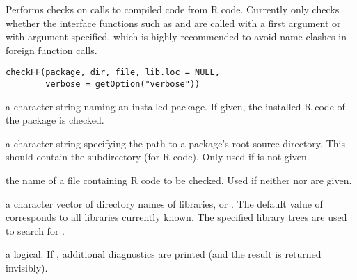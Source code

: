 %
\begin{Examples}
\end{Examples}
%
\begin{Description}\relax
Performs checks on calls to compiled code from R code.  Currently only
checks whether the interface functions such as  and
 are called with a 
first argument or with argument  specified, which is
highly recommended to avoid name clashes in foreign function calls.
\end{Description}
%
\begin{Usage}
\begin{verbatim}
checkFF(package, dir, file, lib.loc = NULL,
        verbose = getOption("verbose"))
\end{verbatim}
\end{Usage}
%
\begin{Arguments}
\begin{ldescription}
\item[\code{package}] a character string naming an installed package.  If
given, the installed R code of the package is checked.
\item[\code{dir}] a character string specifying the path to a package's root
source directory.  This should contain the subdirectory 
(for R code).  Only used if  is not given.
\item[\code{file}] the name of a file containing R code to be checked.  Used
if neither  nor  are given.
\item[\code{lib.loc}] a character vector of directory names of \R{} libraries,
or .  The default value of  corresponds to all
libraries currently known.  The specified library trees are used to
search for .
\item[\code{verbose}] a logical.  If , additional diagnostics are
printed (and the result is returned invisibly).
\end{ldescription}
\end{Arguments}

